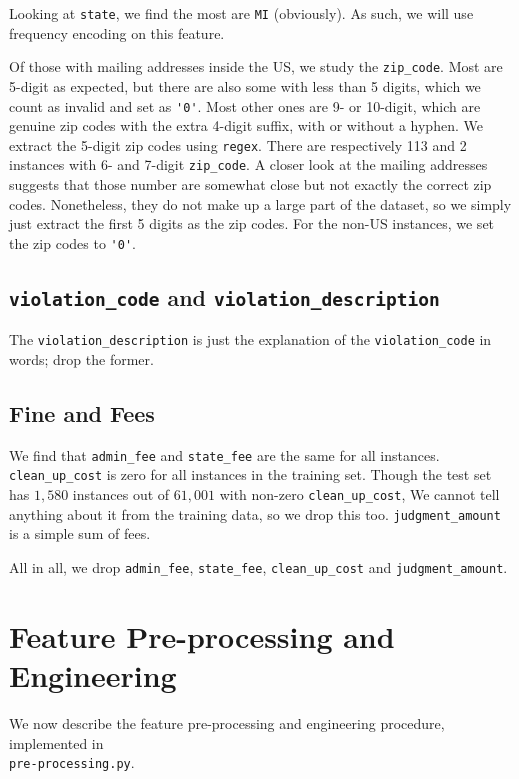 \documentclass[12pt,letterpaper]{article}
\numberwithin{equation}{section}
\begin{document}
Looking at \verb|state|, we find the most are \verb|MI| (obviously). As such, we will use frequency encoding on this feature.

Of those with mailing addresses inside the US, we study the \verb|zip_code|. Most are 5-digit as expected, but there are also some with less than 5 digits, which we count as invalid and set as \verb|'0'|. Most other ones are 9- or 10-digit, which are genuine zip codes with the extra 4-digit suffix, with or without a hyphen. We extract the 5-digit zip codes using \verb|regex|. There are respectively 113 and 2 instances with 6- and 7-digit \verb|zip_code|. A closer look at the mailing addresses suggests that those number are somewhat close but not exactly the correct zip codes. Nonetheless, they do not make up a large part of the dataset, so we simply just extract the first 5 digits as the zip codes. For the non-US instances, we set the zip codes to \verb|'0'|.


\subsection{\texttt{violation\_code} and \texttt{violation\_description}}

The \verb|violation_description| is just the explanation of the \verb|violation_code| in words; drop the former.

\subsection{Fine and Fees}

We find that \verb|admin_fee| and \verb|state_fee| are the same for all instances. \verb|clean_up_cost| is zero for all instances in the training set. Though the test set has $1,580$ instances out of $61,001$ with non-zero \verb|clean_up_cost|, We cannot tell anything about it from the training data, so we drop this too. \verb|judgment_amount| is a simple sum of fees.

All in all, we drop \verb|admin_fee|, \verb|state_fee|, \verb|clean_up_cost| and \verb|judgment_amount|.



\section{Feature Pre-processing and Engineering}

We now describe the feature pre-processing and engineering procedure, implemented in \\\verb|pre-processing.py|.
\end{document}
